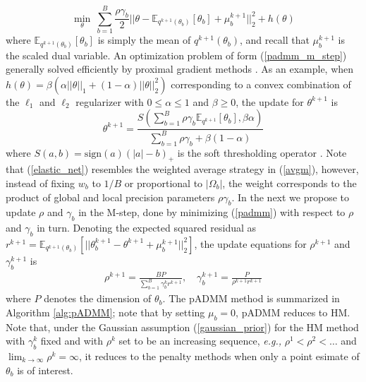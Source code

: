 \documentclass{article}
\newcommand{\eg}[0]{\emph{e.g., }}
\newcommand{\1}[0]{\ensuremath{\boldsymbol{1}}\xspace}
\begin{document}
\begin{equation}\label{padmm_m_step}
\textstyle \min_{\theta} ~\sum_{b=1}^B\frac{\rho\gamma_b}{2}||\theta-\mathbb{E}_{q^{k+1}(\theta_b)}[\theta_b] + \mu^{k+1}_b||^2_2 + h(\theta)
\end{equation}
where $\mathbb{E}_{q^{k+1}(\theta_b)}[\theta_b]$ is simply the mean of $q^{k+1}(\theta_b)$, and recall that $\mu^{k+1}_b$ is the scaled dual variable. An optimization problem of form (\ref{padmm_m_step}) generally solved efficiently by proximal gradient methods \cite{Parikh13}. As an example, when $h(\theta) = \beta(\alpha||\theta||_1 + (1-\alpha)||\theta||^2_2)$ corresponding to a convex combination of the $\ell_1$ and $\ell_2$ regularizer with $0\le\alpha\le 1$ and $\beta\ge0$, the update for $\theta^{k+1}$ is
\begin{equation}\label{elastic_net}
 \theta^{k+1} = \frac{S(\textstyle\sum_{b=1}^B\rho\gamma_b\mathbb{E}_{q^{k+1}}[\theta_b], \beta\alpha )}{\sum_{b=1}^B\rho\gamma_b + \beta(1-\alpha)}
\end{equation}
where $S(a, b) = \mbox{sign}(a)(|a|-b)_{+}$ is the soft thresholding operator \cite{Friedman2010}. Note that (\ref{elastic_net}) resembles the weighted average strategy in (\ref{avgm}), however, instead of fixing $w_b$ to $1/B$ or proportional to $|\Omega_b|$, the weight corresponds to the product of global and local precision parameters $\rho\gamma_b$. In the next we propose to update $\rho$ and $\gamma_b$ in the M-step, done by minimizing (\ref{padmm}) with respect to $\rho$ and $\gamma_b$ in turn. Denoting the expected squared residual as $r^{k+1} = \mathbb{E}_{q^{k+1}(\theta_b)}[||\theta_b^{k+1}-\theta^{k+1}+\mu_b^{k+1}||_2^2]$, the update equations for $\rho^{k+1}$ and $\gamma_b^{k+1}$ is
\begin{equation}\label{em_bayes}
\begin{gathered}
\textstyle \rho^{k+1} = \frac{BP}{\sum_{b=1}^B\gamma_b^kr^{k+1}}, \quad \gamma_b^{k+1} = \frac{P}{\rho^{k+1}r^{k+1}}
\end{gathered}
\end{equation}
where $P$ denotes the dimension of $\theta_b$. The pADMM method is summarized in Algorithm \ref{alg:pADMM}; note that by setting $\mu_b = 0$, pADMM reduces to HM. Note that, under the Gaussian assumption (\ref{gaussian_prior}) for the HM method with $\gamma_b^k$ fixed and with $\rho^k$ set to be an increasing sequence, \eg $\rho^1 < \rho^2 < \ldots$ and $\lim_{k\to\infty}\rho^{k} = \infty$, it reduces to the penalty methods \cite{Bertsekas1996} when only a point esimate of $\theta_b$ is of interest.
\end{document}
